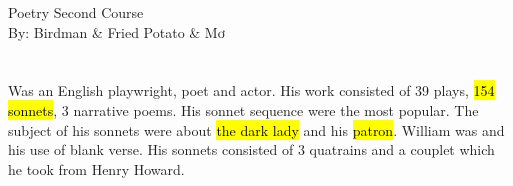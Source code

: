 \documentclass[12pt, a4paper]{article}
\begin{document}
\begin{center}
\huge{Poetry Second Course}\\[0.5cm]
\Large{By: Birdman \& Fried Potato \& Mơ}\\[1cm]
\end{center}

\section*{}
{\fontpar
Was an English playwright, poet and actor. His work consisted
of 39 plays, \hl{154 sonnets}, 3 narrative poems. His sonnet sequence were
the most popular. The subject of his sonnets were about \hl{the dark lady} and his \hl{patron}.
William was  and his use of blank verse. His 
sonnets consisted of 3 quatrains and a couplet which he 
took from Henry Howard.
}
\end{document}

